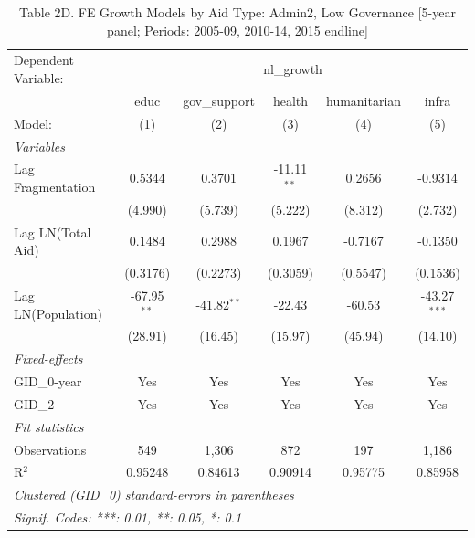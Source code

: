 
\begin{table}[H]
   \caption{Table 2D. FE Growth Models by Aid Type: Admin2, Low Governance [5-year panel; Periods: 2005-09, 2010-14, 2015 endline]}
   \centering
   \begin{tabular}{lccccc}
      \tabularnewline \midrule \midrule
      Dependent Variable: & \multicolumn{5}{c}{nl\_growth}\\
                         & educ          & gov\_support  & health        & humanitarian & infra \\   
      Model:             & (1)           & (2)           & (3)           & (4)          & (5)\\  
      \midrule
      \emph{Variables}\\
      Lag Fragmentation  & 0.5344        & 0.3701        & -11.11$^{**}$ & 0.2656       & -0.9314\\   
                         & (4.990)       & (5.739)       & (5.222)       & (8.312)      & (2.732)\\   
      Lag LN(Total Aid)  & 0.1484        & 0.2988        & 0.1967        & -0.7167      & -0.1350\\   
                         & (0.3176)      & (0.2273)      & (0.3059)      & (0.5547)     & (0.1536)\\   
      Lag LN(Population) & -67.95$^{**}$ & -41.82$^{**}$ & -22.43        & -60.53       & -43.27$^{***}$\\   
                         & (28.91)       & (16.45)       & (15.97)       & (45.94)      & (14.10)\\   
      \midrule
      \emph{Fixed-effects}\\
      GID\_0-year        & Yes           & Yes           & Yes           & Yes          & Yes\\  
      GID\_2             & Yes           & Yes           & Yes           & Yes          & Yes\\  
      \midrule
      \emph{Fit statistics}\\
      Observations       & 549           & 1,306         & 872           & 197          & 1,186\\  
      R$^2$              & 0.95248       & 0.84613       & 0.90914       & 0.95775      & 0.85958\\  
      \midrule \midrule
      \multicolumn{6}{l}{\emph{Clustered (GID\_0) standard-errors in parentheses}}\\
      \multicolumn{6}{l}{\emph{Signif. Codes: ***: 0.01, **: 0.05, *: 0.1}}\\
   \end{tabular}
\end{table}



